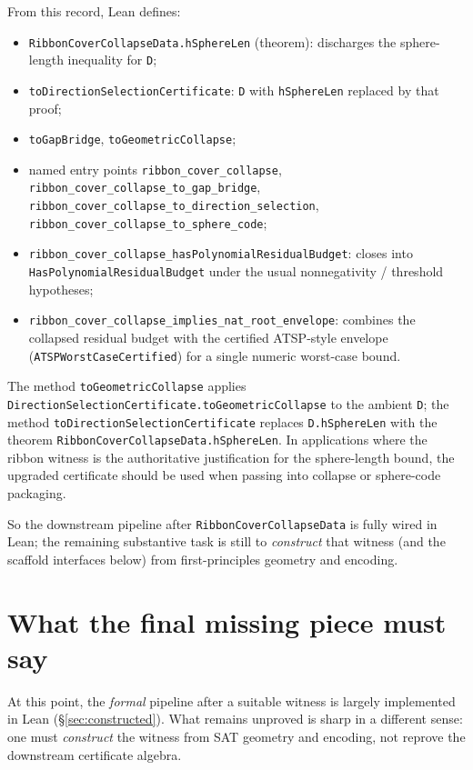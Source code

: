 \documentclass[11pt]{article}
\begin{document}
From this record, Lean defines:

\begin{itemize}[leftmargin=2em]
  \item \texttt{RibbonCoverCollapseData.hSphereLen} (theorem): discharges the sphere-length inequality for \texttt{D};
  \item \texttt{toDirectionSelectionCertificate}: \texttt{D} with \texttt{hSphereLen} replaced by that proof;
  \item \texttt{toGapBridge}, \texttt{toGeometricCollapse};
  \item named entry points \texttt{ribbon\_cover\_collapse},
  \texttt{ribbon\_cover\_collapse\_to\_gap\_bridge},
  \texttt{ribbon\_cover\_collapse\_to\_direction\_selection},
  \texttt{ribbon\_cover\_collapse\_to\_sphere\_code};
  \item \texttt{ribbon\_cover\_collapse\_hasPolynomialResidualBudget}: closes into
  \texttt{HasPolynomialResidualBudget} under the usual nonnegativity / threshold hypotheses;
  \item \texttt{ribbon\_cover\_collapse\_implies\_nat\_root\_envelope}: combines the collapsed residual budget
  with the certified ATSP-style envelope (\texttt{ATSPWorstCaseCertified}) for a single numeric worst-case bound.
\end{itemize}

The method \texttt{toGeometricCollapse} applies \texttt{DirectionSelectionCertificate.toGeometricCollapse} to the
ambient \texttt{D}; the method \texttt{toDirectionSelectionCertificate} replaces \texttt{D.hSphereLen} with the
theorem \texttt{RibbonCoverCollapseData.hSphereLen}.  In applications where the ribbon witness is the
authoritative justification for the sphere-length bound, the upgraded certificate should be used when
passing into collapse or sphere-code packaging.

So the downstream pipeline after \texttt{RibbonCoverCollapseData} is fully wired in Lean; the
remaining substantive task is still to \emph{construct} that witness (and the scaffold interfaces
below) from first-principles geometry and encoding.

\section{What the final missing piece must say}

At this point, the \emph{formal} pipeline after a suitable witness is largely implemented
in Lean (\S\ref{sec:constructed}).  What remains unproved is sharp in a different sense:
one must \emph{construct} the witness from SAT geometry and encoding, not reprove the
downstream certificate algebra.
\end{document}
